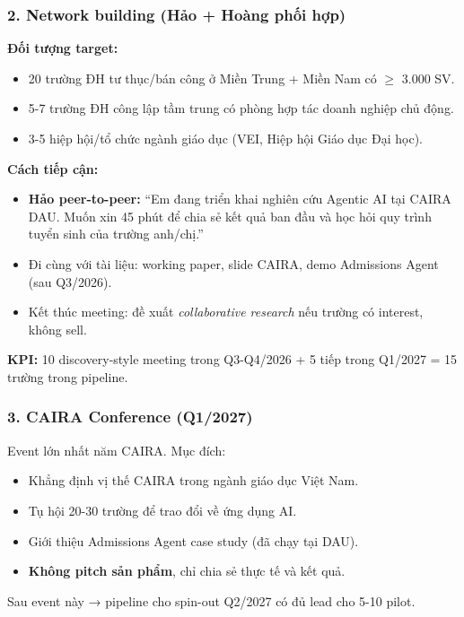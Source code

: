 \documentclass[11pt,a4paper]{article}
\begin{document}
\subsubsection*{2. Network building (Hảo + Hoàng phối hợp)}

\textbf{Đối tượng target:}
\begin{itemize}
\item 20 trường ĐH tư thục/bán công ở Miền Trung + Miền Nam có $\geq$ 3.000 SV.
\item 5-7 trường ĐH công lập tầm trung có phòng hợp tác doanh nghiệp chủ động.
\item 3-5 hiệp hội/tổ chức ngành giáo dục (VEI, Hiệp hội Giáo dục Đại học).
\end{itemize}

\textbf{Cách tiếp cận:}
\begin{itemize}
\item \textbf{Hảo peer-to-peer:} ``Em đang triển khai nghiên cứu Agentic AI tại CAIRA DAU. Muốn xin 45 phút để chia sẻ kết quả ban đầu và học hỏi quy trình tuyển sinh của trường anh/chị.''
\item Đi cùng với tài liệu: working paper, slide CAIRA, demo Admissions Agent (sau Q3/2026).
\item Kết thúc meeting: đề xuất \textit{collaborative research} nếu trường có interest, không sell.
\end{itemize}

\textbf{KPI:} 10 discovery-style meeting trong Q3-Q4/2026 + 5 tiếp trong Q1/2027 = 15 trường trong pipeline.

\subsubsection*{3. CAIRA Conference (Q1/2027)}

Event lớn nhất năm CAIRA. Mục đích:
\begin{itemize}
\item Khẳng định vị thế CAIRA trong ngành giáo dục Việt Nam.
\item Tụ hội 20-30 trường để trao đổi về ứng dụng AI.
\item Giới thiệu Admissions Agent case study (đã chạy tại DAU).
\item \textbf{Không pitch sản phẩm}, chỉ chia sẻ thực tế và kết quả.
\end{itemize}

Sau event này → pipeline cho spin-out Q2/2027 có đủ lead cho 5-10 pilot.

\clearpage
\end{document}
